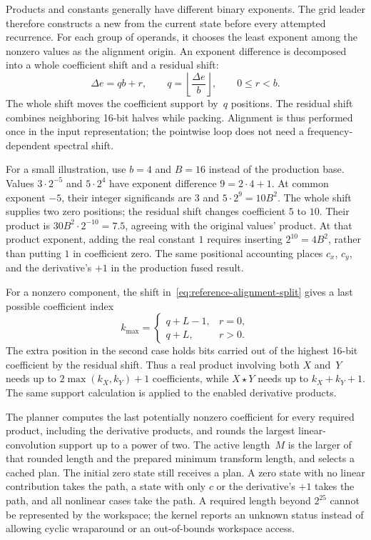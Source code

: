 Products and constants generally have different binary exponents.  The grid
leader therefore constructs a new  from the
current state before every attempted recurrence.  For each group of operands, it
chooses the least exponent among the nonzero values as the alignment origin.
An exponent difference is decomposed into a whole coefficient shift and a
residual shift:
\begin{equation}
  \Delta e = qb+r,
  \qquad
  q=\left\lfloor\frac{\Delta e}{b}\right\rfloor,
  \qquad
  0\le r<b.
  \label{eq:reference-alignment-split}
\end{equation}
The whole shift moves the coefficient support by~$q$ positions.  The residual
shift combines neighboring 16-bit halves while packing.  Alignment is thus
performed once in the input representation; the pointwise loop does not need
a frequency-dependent spectral shift.

For a small illustration, use $b=4$ and $B=16$ instead of the production
base.  Values $3\cdot2^{-5}$ and $5\cdot2^4$ have exponent difference
$9=2\cdot4+1$.  At common exponent $-5$, their integer significands are
$3$ and $5\cdot2^9=10B^2$.  The whole shift supplies two zero positions;
the residual shift changes coefficient $5$ to $10$.  Their product is
$30B^2\cdot2^{-10}=7.5$, agreeing with the original values' product.
At that product exponent, adding the real constant $1$ requires inserting
$2^{10}=4B^2$, rather than putting $1$ in coefficient zero.  The same
positional accounting places $c_x$, $c_y$, and the derivative's $+1$ in
the production fused result.

For a nonzero component, the shift in~\eqref{eq:reference-alignment-split}
gives a last possible coefficient index
\begin{equation}
  k_{\max}=
  \begin{cases}
    q+L-1, & r=0, \\
    q+L, & r>0.
  \end{cases}
  \label{eq:reference-packed-support}
\end{equation}
The extra position in the second case holds bits carried out of the highest
16-bit coefficient by the residual shift.  Thus a real product involving both
$X$ and~$Y$ needs up to $2\max(k_X,k_Y)+1$ coefficients, while $X\star Y$
needs up to $k_X+k_Y+1$.  The same support calculation is applied to the
enabled derivative products.

The planner computes the last potentially nonzero coefficient for every
required product, including the derivative products, and rounds the largest
linear-convolution support up to a power of two.  The active length~$M$ is the
larger of that rounded length and the prepared minimum transform length, and
selects a cached plan.  The initial zero state still receives a plan.  A
zero state with no linear contribution takes the
 path, a state with only $c$ or the derivative's $+1$ takes the
 path, and all nonlinear cases take the  path.  A
required length beyond $2^{25}$ cannot be represented by the workspace; the
kernel reports an unknown status instead of allowing cyclic wraparound or an
out-of-bounds workspace access.

